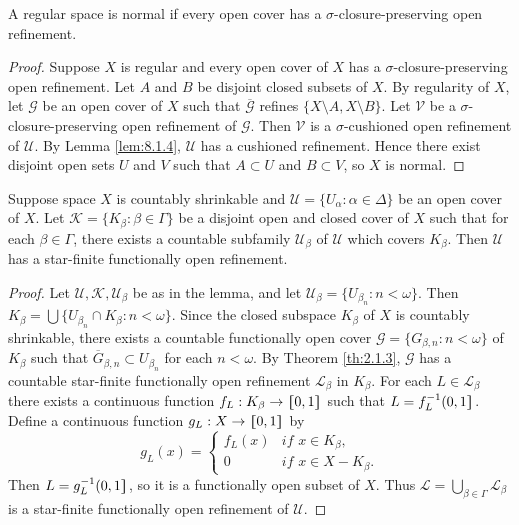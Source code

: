 \documentclass[jiang8iv.tex]{subfiles}
\begin{document}
{\theorem{\label{th:8.3.5}} A regular space is normal if every open
cover has a $\sigma$-closure-preserving open refinement.
}

\begin{proof} 
Suppose $X$ is regular and every open cover of $X$ has a
$\sigma$-closure-preserving open refinement. Let $A$ and $B$ be disjoint closed subsets
of $X$. By regularity of $X$, let $\mathscr{G}$ be an open cover of $X$ such that $\mathscr{\overline{G}}$
refines $\{X\setminus A, X\setminus B\}$. Let $\mathscr{V}$ be a $\sigma$-closure-preserving open refinement of $\mathscr{G}$. Then $\mathscr{V}$ is a $\sigma$-cushioned open refinement of $\mathscr{U}$. By
Lemma \ref{lem:8.1.4}, $\mathscr{U}$ has a cushioned refinement.
Hence there exist disjoint open sets $U$ and $V$ such that $A\subset U$ 
and $B\subset V$,
so $X$ is normal.
\end{proof}

{\lemma{\label{lem:8.3.6}}  
Suppose space $X$ is countably shrinkable and 
$\mathscr{U} = \{U_\alpha: \alpha\in \Delta\}$
be an open cover of $X$. Let $\mathscr{K} = \{K_\beta: \beta\in\Gamma\}$ be a
disjoint open and closed cover of $X$ such that for each $\beta\in\Gamma$,
there exists a countable subfamily $\mathscr{U}_\beta$ of $\mathscr{U}$ 
which covers $K_\beta$.
Then $\mathscr{U}$ has a star-finite functionally open refinement.
}

\begin{proof} 
Let $\mathscr{U}, \mathscr{K}, \mathscr{U}_\beta$ be as in the lemma, and let 
$\mathscr{U}_\beta = \{U_{\beta_n} : n < \omega\}$.
Then $K_\beta = \bigcup\{U_{\beta_n}\cap K_\beta: n < \omega\}$.
Since the closed subspace $K_\beta$ of $X$ is countably shrinkable, there exists a countable functionally  open cover 
$\mathscr{G}=\{G_{\beta, n}: n<\omega\}$ of $K_\beta$ such that 
$\overline{G}_{\beta, n} \subset U_{\beta_n}$ for each $n < \omega$.
By Theorem \ref{th:2.1.3}, $\mathscr{G}$ has a countable star-finite functionally 
open refinement $\mathscr{L}_\beta$ in $K_\beta$.
For each $L \in \mathscr{L}_\beta$ there exists a continuous function $f_L : K_\beta \to \hstretch{1.8}{[}0,1\hstretch{1.8}{]}$ such that $L = f_L^{-1}(0,1\hstretch{1.8}{]}$.
Define a continuous function $g_L : X \to \hstretch{1.8}{[}0,1\hstretch{1.8}{]}$ by
$$g_L(x) = 
\begin{cases} 
	f_L(x) & \textit{if } x \in K_\beta, \\ 
	0 & \textit{if } x \in X - K_\beta.
\end{cases}$$
Then $L = g_L^{-1}(0,1\hstretch{1.8}{]}$, so it is a functionally open subset of $X$.
Thus $\mathscr{L} = \bigcup_{\beta \in \Gamma} \mathscr{L}_\beta$ is a star-finite functionally open refinement of $\mathscr{U}$.
\end{proof}
\end{document}
